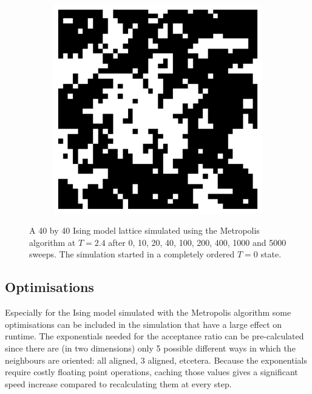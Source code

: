 \documentclass[11pt, a4paper]{report} %
\begin{document}
\begin{figure}[htb]
\begin{subfigure}[c]{0.2\linewidth}
	\end{subfigure}
	~
	\begin{subfigure}[c]{0.2\linewidth}
		\includegraphics[width=\linewidth]{20160603125722_40_by_40_Lattice_step5000.pdf}
	\end{subfigure}
	\caption{A 40 by 40 Ising model lattice simulated using the Metropolis algorithm at \(T=2.4\) after 0, 10, 20, 40, 100, 200, 400, 1000	and 5000 sweeps. The simulation started in a completely ordered \(T=0\) state.}
	\label{fig:metropolis_ising_at_steps}
\end{figure}

\subsection{Optimisations}
Especially for the Ising model simulated with the Metropolis algorithm some optimisations can be included in the simulation that have a large effect on runtime.
The exponentials needed for the acceptance ratio can be pre-calculated since there are (in two dimensions) only 5 possible different ways in which the neighbours are oriented:
all aligned, 3 aligned, etcetera.
Because the exponentials require costly floating point operations, caching those values gives a significant speed increase compared to recalculating them at every step.
\end{document}
